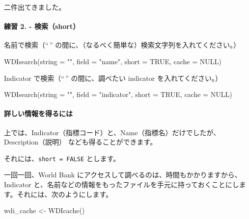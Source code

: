 \documentclass[
]{bxjsbook}
\newenvironment{Shaded}{\begin{snugshade}}{\end{snugshade}}
\newcommand{\AttributeTok}[1]{\textcolor[rgb]{0.77,0.63,0.00}{#1}}
\newcommand{\ConstantTok}[1]{\textcolor[rgb]{0.00,0.00,0.00}{#1}}
\newcommand{\FunctionTok}[1]{\textcolor[rgb]{0.00,0.00,0.00}{#1}}
\newcommand{\NormalTok}[1]{#1}
\newcommand{\OtherTok}[1]{\textcolor[rgb]{0.56,0.35,0.01}{#1}}
\newcommand{\StringTok}[1]{\textcolor[rgb]{0.31,0.60,0.02}{#1}}
\theoremstyle{definition}
\theoremstyle{definition}
\theoremstyle{definition}
\theoremstyle{definition}
\theoremstyle{remark}
\begin{document}
二件出てきました。

\hypertarget{ux7df4ux7fd2-2.---ux691cux7d22short}{%
\paragraph{練習 2. - 検索（short）}\label{ux7df4ux7fd2-2.---ux691cux7d22short}}

名前で検索（``\,'' の間に、（なるべく簡単な）検索文字列を入れてください。）

\begin{Shaded}
\begin{Highlighting}[]
\FunctionTok{WDIsearch}\NormalTok{(}\AttributeTok{string =} \StringTok{""}\NormalTok{, }\AttributeTok{field =} \StringTok{"name"}\NormalTok{, }\AttributeTok{short =} \ConstantTok{TRUE}\NormalTok{, }\AttributeTok{cache =} \ConstantTok{NULL}\NormalTok{)}
\end{Highlighting}
\end{Shaded}

Indicator で検索（``\,'' の間に、調べたい indicator を入れてください。）

\begin{Shaded}
\begin{Highlighting}[]
\FunctionTok{WDIsearch}\NormalTok{(}\AttributeTok{string =} \StringTok{""}\NormalTok{, }\AttributeTok{field =} \StringTok{"indicator"}\NormalTok{, }\AttributeTok{short =} \ConstantTok{TRUE}\NormalTok{, }\AttributeTok{cache =} \ConstantTok{NULL}\NormalTok{)}
\end{Highlighting}
\end{Shaded}

\hypertarget{ux8a73ux3057ux3044ux60c5ux5831ux3092ux5f97ux308bux306bux306f}{%
\paragraph{詳しい情報を得るには}\label{ux8a73ux3057ux3044ux60c5ux5831ux3092ux5f97ux308bux306bux306f}}

上では、Indicator（指標コード）と、Name（指標名）だけでしたが、Description（説明） なども得ることができます。

それには、\texttt{short\ =\ FALSE} とします。

一回一回、World Bank にアクセスして調べるのは、時間もかかりますから、Indicator と、名前などの情報をもったファイルを手元に持っておくことにします。それには、次のようにします。

\begin{Shaded}
\begin{Highlighting}[]
\NormalTok{wdi\_cache }\OtherTok{\textless{}{-}} \FunctionTok{WDIcache}\NormalTok{()}
\end{Highlighting}
\end{Shaded}
\end{document}
